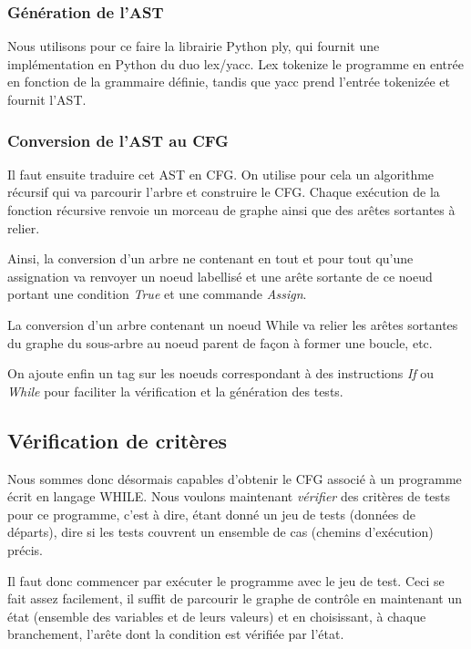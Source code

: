 \documentclass[a4paper, 12pt]{report}
\begin{document}
\subsubsection{Génération de l'AST}

Nous utilisons pour ce faire la librairie Python ply, qui fournit une implémentation en Python du duo lex/yacc. Lex tokenize le programme en entrée en fonction de la grammaire définie, tandis que yacc prend l'entrée tokenizée et fournit l'AST. 

\subsubsection{Conversion de l'AST au CFG}

Il faut ensuite traduire cet AST en CFG. On utilise pour cela un algorithme récursif qui va parcourir l'arbre et construire le CFG. Chaque exécution de la fonction récursive renvoie un morceau de graphe ainsi que des arêtes sortantes à relier.

Ainsi, la conversion d'un arbre ne contenant en tout et pour tout qu'une assignation va renvoyer un noeud labellisé et une arête sortante de ce noeud portant une condition \textit{True} et une commande \textit{Assign}.

La conversion d'un arbre contenant un noeud While va relier les arêtes sortantes du graphe du sous-arbre au noeud parent de façon à former une boucle, etc.

On ajoute enfin un tag sur les noeuds correspondant à des instructions \textit{If} ou \textit{While} pour faciliter la vérification et la génération des tests.

\subsection{Vérification de critères}

Nous sommes donc désormais capables d'obtenir le CFG associé à un programme écrit en langage WHILE. Nous voulons maintenant \textit{vérifier} des critères de tests pour ce programme, c'est à dire, étant donné un jeu de tests (données de départs), dire si les tests couvrent un ensemble de cas (chemins d'exécution) précis.

Il faut donc commencer par exécuter le programme avec le jeu de test. Ceci se fait assez facilement, il suffit de parcourir le graphe de contrôle en maintenant un état (ensemble des variables et de leurs valeurs) et en choisissant, à chaque branchement, l'arête dont la condition est vérifiée par l'état.
\end{document}
